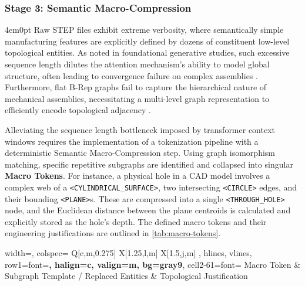 		\subsubsection{Stage 3: Semantic Macro-Compression}
			\begin{indentedblock}{4em}{0pt}
				Raw STEP files exhibit extreme verbosity, where semantically simple manufacturing features are explicitly defined by dozens of constituent low-level topological entities. As noted in foundational generative studies, such excessive sequence length dilutes the attention mechanism's ability to model global structure, often leading to convergence failure on complex assemblies \parencite{deepcad_wu}. Furthermore, flat B-Rep graphs fail to capture the hierarchical nature of mechanical assemblies, necessitating a multi-level graph representation to efficiently encode topological adjacency \parencite{colligan_2022_hierarchical}. 
				
				
				Alleviating the sequence length bottleneck imposed by transformer context windows requires the implementation of a tokenization pipeline with a deterministic Semantic Macro-Compression step. Using graph isomorphism matching, specific repetitive subgraphs are identified and collapsed into singular \textbf{Macro Tokens}. For instance, a physical hole in a CAD model involves a complex web of a \texttt{<CYLINDRICAL\_SURFACE>}, two intersecting \texttt{<CIRCLE>} edges, and their bounding \texttt{<PLANE>}s. These are compressed into a single \texttt{<THROUGH\_HOLE>} node, and the Euclidean distance between the plane centroids is calculated and explicitly stored as the hole's depth. The defined macro tokens and their engineering justifications are outlined in \autoref{tab:macro-tokens}.
				
				\begin{table}[H]
					\centering
					\caption{Defined Semantic Macro Tokens and Topological Justifications}
					\fontsize{10bp}{\baselineskip}\selectfont
					\begin{tblr}{
							width=\linewidth,
							colspec={
								Q[c,m,0.275\linewidth]  %
								X[1.25,l,m]            %
								X[1.5,j,m]            %
							},
							hlines,
							vlines,
							row{1}={font=\bfseries, halign=c, valign=m, bg=gray9}, 
							cell{2-6}{1}={font=\ttfamily} %
						}
						Macro Token & Subgraph Template / Replaced Entities & Topological Justification \\
						

\end{tblr}
\end{table}
\end{indentedblock}
